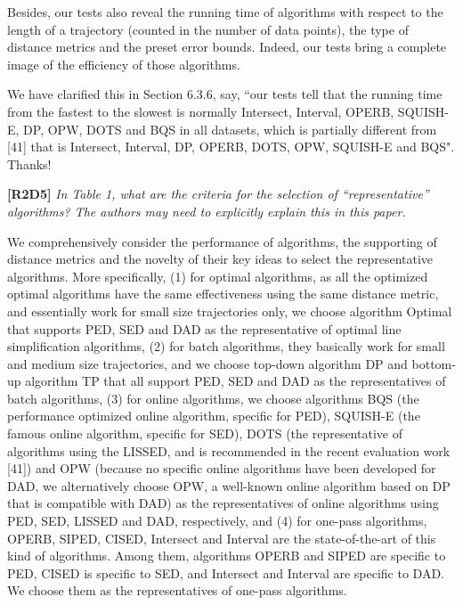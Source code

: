 \documentclass{letter}
\begin{document}
{{Besides, our tests also reveal the running time of algorithms with respect to the length of a trajectory (counted in the number of data points), the type of distance metrics and the preset error bounds. Indeed, our tests bring a complete image of the efficiency of those algorithms.



We have clarified this in Section 6.3.6, say, ``our tests tell that the running time from the fastest to the slowest is normally Intersect, Interval, OPERB, SQUISH-E, DP, OPW, DOTS and BQS in all datasets, which is partially different from [41] that is Intersect, Interval, DP, OPERB, DOTS, OPW, SQUISH-E and BQS". Thanks!




\textbf{[R2D5]} \emph{In Table 1, what are the criteria for the selection of “representative” algorithms? The authors may need to explicitly explain this in this paper.}

We comprehensively consider the performance of algorithms, the supporting of distance metrics and the novelty of their key ideas to select the representative algorithms. More specifically, 
(1) for optimal algorithms, {as all the optimized optimal algorithms have the same effectiveness using the same distance metric, and essentially work for small size trajectories only, we choose algorithm Optimal that supports PED, SED and DAD as the representative of optimal line simplification algorithms,}
%
(2) for batch algorithms, {they basically work for small and medium size trajectories, and we choose top-down algorithm DP and bottom-up algorithm TP that all support PED, SED and DAD as the representatives of batch algorithms,}
%
(3) for online algorithms, we choose algorithms BQS ({the performance optimized online algorithm, specific for PED}), SQUISH-E ({the famous online algorithm, specific for SED}), {DOTS ({the representative of algorithms using the LISSED, and is recommended in the recent evaluation work [41]})} and OPW ({because no specific online algorithms have been developed for DAD, we alternatively choose OPW, a well-known online algorithm based on DP that is compatible with DAD}) as the representatives of online algorithms using PED, SED, {LISSED} and DAD, respectively, and
%
(4) for one-pass algorithms, OPERB, SIPED, CISED, Intersect and Interval are the state-of-the-art of this kind of algorithms. Among them, algorithms OPERB and SIPED are specific to PED, CISED is specific to SED, and Intersect and Interval are specific to DAD. We choose them as the representatives of one-pass algorithms.

}}
\end{document}
